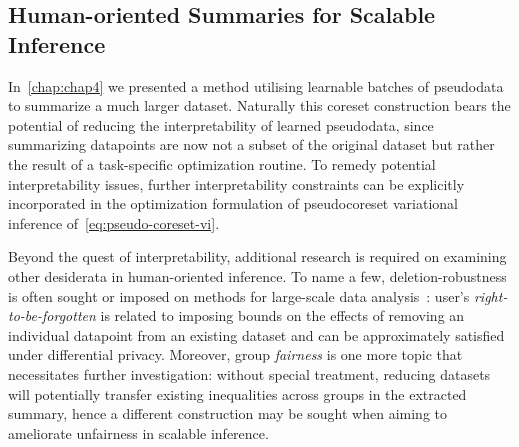 \subsection{Human-oriented Summaries for Scalable Inference}
\label{subsec:human-oriented-pseudodata}

In~\cref{chap:chap4} we presented a method utilising learnable batches of pseudodata to summarize a much larger dataset. Naturally this coreset construction bears the potential of reducing the interpretability of learned pseudodata, since summarizing datapoints are now not a subset of the original dataset but rather the result of a task-specific optimization routine. To remedy potential interpretability issues, further interpretability constraints can be explicitly incorporated in the optimization formulation of pseudocoreset variational inference of~\cref{eq:pseudo-coreset-vi}.

Beyond the quest of interpretability, additional research is required on examining other desiderata in human-oriented inference. To name a few, deletion-robustness is often sought or imposed on methods for large-scale data analysis~\citep{mirzasoleiman17, ginart19}: user's \emph{right-to-be-forgotten} is related to imposing bounds on the effects of removing an individual datapoint from an existing dataset and can be approximately satisfied under differential privacy. Moreover, group \emph{fairness} is one more topic that necessitates further investigation: without special treatment, reducing datasets will potentially transfer existing inequalities across groups in the extracted summary, hence a different construction may be sought when aiming to ameliorate unfairness in scalable inference.  